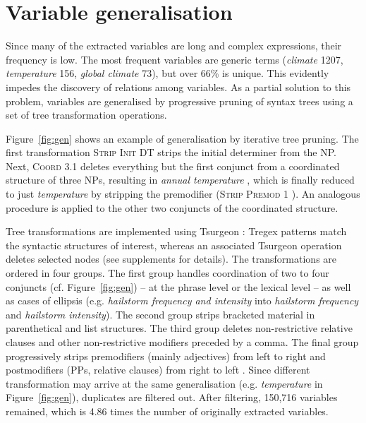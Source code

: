 \documentclass[11pt]{article}
\begin{document}
\section{Variable generalisation}

Since many of the extracted variables are long and complex expressions, their frequency is low.
The most frequent variables are generic terms (\emph{climate} 1207,  \emph{temperature} 156, \emph{global climate} 73), but over 66\% is unique.
This evidently impedes the discovery of relations among variables.
As a partial solution to this problem, variables are generalised by progressive pruning of syntax trees using a set of tree transformation operations.

Figure~\ref{fig:gen} shows an example of generalisation by iterative tree pruning.
The first transformation \textsc{Strip Init DT}  strips the initial determiner from the NP.
Next,  \textsc{Coord 3.1}  deletes everything but the first conjunct from a coordinated structure of three NPs, resulting in \emph{annual temperature} , which is finally reduced to just \emph{temperature} by stripping the premodifier (\textsc{Strip Premod 1} ).
An analogous procedure is applied to the other two conjuncts of the coordinated structure.

Tree transformations are implemented using Tsurgeon \cite{Levy2006}: Tregex patterns match the syntactic structures of interest, whereas an associated Tsurgeon operation deletes selected  nodes (see supplements for details).
The transformations are ordered in four groups.
The first group handles coordination of two to four conjuncts (cf. Figure~\ref{fig:gen}) -- at the phrase level or the lexical level -- as well as cases of ellipsis (e.g.  \emph{hailstorm frequency and intensity} into \emph{hailstorm frequency} and \emph{hailstorm intensity}).
The second group strips bracketed material in parenthetical and list structures.
The  third group  deletes non-restrictive relative clauses and other non-restrictive modifiers preceded by a comma.
The final group progressively strips premodifiers (mainly adjectives) from left to right and postmodifiers (PPs, relative clauses) from right to left .
Since different transformation may arrive at the same generalisation  (e.g. \emph{temperature} in Figure~\ref{fig:gen}), duplicates are filtered out.
After filtering, 150,716 variables remained, which is 4.86 times the number of originally extracted variables.
\end{document}
